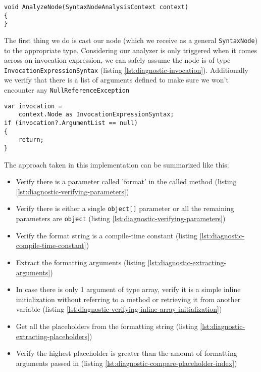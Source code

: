 \begin{lstlisting}[label={lst:diagnostic-analyzenode}]
void AnalyzeNode(SyntaxNodeAnalysisContext context)
{
}
\end{lstlisting}

The first thing we do is cast our node (which we receive as a general \texttt{SyntaxNode}) to the appropriate type. Considering our analyzer is only triggered when it comes across an \gls{invocation} expression, we can safely assume the node is of type \texttt{InvocationExpressionSyntax} (listing \ref{lst:diagnostic-invocation}). Additionally we verify that there is a list of arguments defined to make sure we won't encounter any \texttt{NullReferenceException}

\begin{lstlisting}[label={lst:diagnostic-invocation}]
var invocation = 
	context.Node as InvocationExpressionSyntax;
if (invocation?.ArgumentList == null)
{
	return;
}
\end{lstlisting}

The approach taken in this implementation can be summarized like this:

\begin{itemize}
\item Verify there is a parameter called 'format' in the called method (listing \ref{lst:diagnostic-verifying-parameters})
\item Verify there is either a single \texttt{object[]} parameter or all the remaining parameters are \texttt{object} (listing \ref{lst:diagnostic-verifying-parameters})
\item Verify the format string is a compile-time constant (listing \ref{lst:diagnostic-compile-time-constant})
\item Extract the formatting arguments (listing \ref{lst:diagnostic-extracting-arguments})
\item In case there is only 1 argument of type array, verify it is a simple inline initialization without referring to a method or retrieving it from another variable (listing \ref{lst:diagnostic-verifying-inline-array-initialization})
\item Get all the placeholders from the formatting string (listing \ref{lst:diagnostic-extracting-placeholders})
\item Verify the highest placeholder is greater than the amount of formatting arguments passed in (listing \ref{lst:diagnostic-compare-placeholder-index})
\end{itemize}

